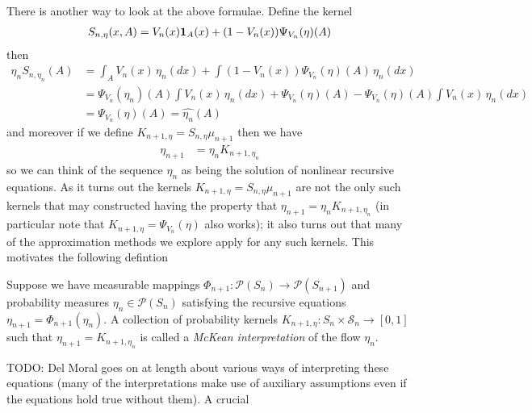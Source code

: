 There is another way to look at the above formulae.  Define the kernel
\begin{align*}
S_{n, \eta} (x, A) &= V_n(x) \textbf{1}_{A}(x) + (1 - V_n(x)) \Psi_{V_n}(\eta)(A) \\
\end{align*}
then
\begin{align*}
\eta_n S_{n, \eta_n} (A) &= \int_A V_n(x) \, \eta_n(dx) + \int  (1 - V_n(x)) \Psi_{V_n}(\eta)(A) \, \eta_n(dx) \\
&= \Psi_{V_n}(\eta_n)(A) \int V_n(x) \, \eta_n(dx) + \Psi_{V_n}(\eta)(A) - \Psi_{V_n}(\eta)(A) \int V_n(x) \, \eta_n(dx) \\
&=\Psi_{V_n}(\eta)(A)  = \hat{\eta_n}(A)
\end{align*}
and moreover if we define $K_{n+1, \eta} = S_{n, \eta} \mu_{n+1}$ then we have
\begin{align*}
\eta_{n+1} &= \eta_n K_{n+1, \eta_n}
\end{align*}
so we can think of the sequence $\eta_n$ as being the solution of nonlinear recursive equations.  As it turns out the kernels $K_{n+1, \eta} = S_{n, \eta} \mu_{n+1}$ are not the only such kernels that may
constructed having the property that $\eta_{n+1} = \eta_n K_{n+1, \eta_n}$ (in particular note that $K_{n+1, \eta} = \Psi_{V_n}(\eta)$ also works); it also turns out that many of the approximation methods we explore apply for any such kernels. This motivates the following
defintion
\begin{defn}Suppose we have measurable mappings $\Phi_{n+1} : \mathcal{P}(S_n) \to \mathcal{P}(S_{n+1})$ and probability measures $\eta_n \in \mathcal{P}(S_n)$ satisfying the recursive equations $\eta_{n+1} = \Phi_{n+1}(\eta_n)$.  A collection of probability kernels $K_{n+1, \eta} : S_n \times \mathcal{S}_{n} \to [0,1]$ such that $\eta_{n+1} = K_{n+1, \eta_n}$ is called a \emph{McKean interpretation} of the flow $\eta_n$.
\end{defn}

TODO: Del Moral goes on at length about various ways of interpreting these equations (many of the interpretations make use of auxiliary assumptions even if the equations hold true without them).  A crucial 

